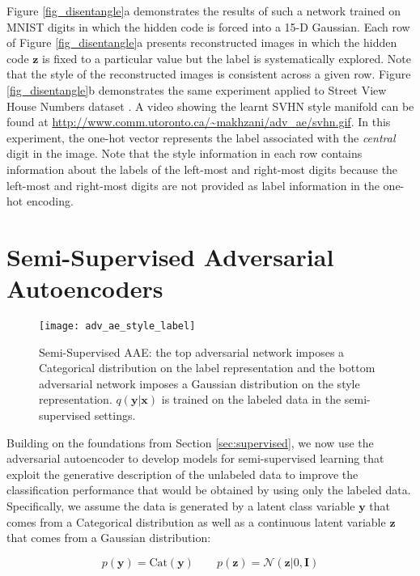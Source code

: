 \documentclass{article}
\begin{document}
Figure \ref{fig_disentangle}a demonstrates the results of such a network trained on MNIST digits in which the hidden code is forced into a 15-D Gaussian.
Each row of Figure \ref{fig_disentangle}a presents reconstructed images in which the hidden code $\mathbf{z}$ is fixed to a particular value but the label is systematically explored.
Note that the style of the reconstructed images is consistent across a given row.
Figure \ref{fig_disentangle}b demonstrates the same experiment applied to Street View House Numbers dataset \citep{svhn}. A video showing the learnt SVHN style manifold can be found at \url{http://www.comm.utoronto.ca/~makhzani/adv_ae/svhn.gif}.
In this experiment, the one-hot vector represents the label associated with the \textit{central} digit in the image.
Note that the style information in each row contains information about the labels of the left-most and right-most digits because the left-most and right-most digits are not provided as label information in the one-hot encoding.


\section{Semi-Supervised Adversarial Autoencoders}\label{sec:semi-supervised}

\begin{figure}[b]
\begin{center}
\centering 
\texttt{[image: adv\_ae\_style\_label]}
\caption{\label{fig_semi_aae}Semi-Supervised AAE: the top adversarial network imposes a Categorical distribution on the label representation and the bottom adversarial network imposes a Gaussian distribution on the style representation. $q(\mathbf{y}|\mathbf{x})$ is trained on the labeled data in the semi-supervised settings. }
\end{center}
\end{figure}


Building on the foundations from Section \ref{sec:supervised}, we now use the adversarial autoencoder to develop models for semi-supervised learning that exploit the generative description of the unlabeled data to improve the classification performance that would be obtained by using only the labeled data. Specifically, we assume the data is generated by a latent class variable $\mathbf{y}$ that comes from a Categorical distribution as well as a continuous latent variable $\mathbf{z}$ that comes from a Gaussian distribution:

$$p(\mathbf{y}) = \text{Cat}(\mathbf{y}) \qquad  p(\mathbf{\mathbf{z}}) = \mathcal{N}(\mathbf{z}|0,\mathbf{I})$$
\end{document}
